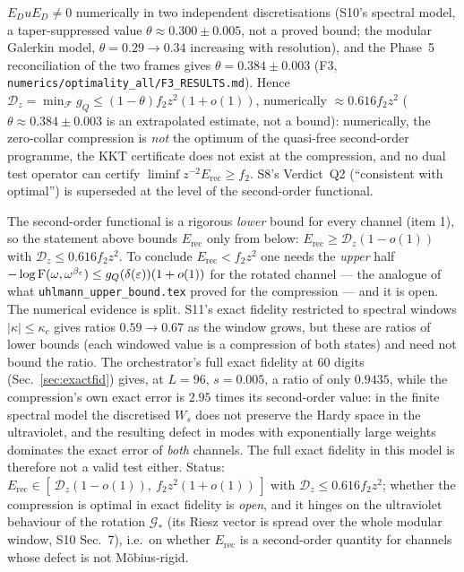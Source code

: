 \documentclass[11pt,a4paper]{article}
\newcommand{\Erec}{E_{\mathrm{rec}}}\newcommand{\Krec}{\mathcal K_{\mathrm{rec}}}
\begin{document}
\begin{verdictbreak}
\(E_DuE_D\ne0\) numerically in two independent discretisations (S10's spectral model,
a taper-suppressed value \(\theta\approx0.300\pm0.005\), not a proved bound; the modular Galerkin model,
\(\theta=0.29\to0.34\) increasing with resolution), and the Phase~5 reconciliation of the two
frames gives \(\theta=0.384\pm0.003\) (F3, \texttt{numerics/optimality\_all/F3\_RESULTS.md}).
Hence \(\mathcal D_z=\min_{\mathcal F}g_Q\le(1-\theta)f_2z^2(1+o(1))\), numerically \(\approx0.616f_2z^2\) (\(\theta\approx0.384\pm0.003\) is an extrapolated estimate, not a bound): numerically, the zero-collar
compression is \emph{not} the optimum of the quasi-free second-order programme, the KKT certificate
does not exist at the compression, and no dual test operator can certify \(\liminf z^{-2}\Erec\ge f_2\).
S8's Verdict~Q2 (``consistent with optimal'') is superseded at the level of the second-order functional.
\end{verdictbreak}

\begin{verdictgap}
The second-order functional is a rigorous \emph{lower} bound for every channel (item 1), so the
statement above bounds \(\Erec\) only from below: \(\Erec\ge\mathcal D_z(1-o(1))\) with
\(\mathcal D_z\le0.616f_2z^2\).  To conclude \(\Erec<f_2z^2\) one needs the \emph{upper} half
\(-\log\operatorname{F}(\omega,\omega^{\beta_\varepsilon})\le g_Q(\delta(\varepsilon))(1+o(1))\) for the rotated channel --- the
analogue of what \texttt{uhlmann\_upper\_bound.tex} proved for the compression --- and it is open.  The
numerical evidence is split.  S11's exact fidelity restricted to spectral windows \(|\kappa|\le\kappa_c\)
gives ratios \(0.59\to0.67\) as the window grows, but these are ratios of lower bounds (each windowed
value is a compression of both states) and need not bound the ratio.  The orchestrator's full exact
fidelity at \(60\) digits (Sec.~\ref{sec:exactfid}) gives, at \(L=96\), \(s=0.005\), a ratio of only
\(0.9435\), while the compression's own exact error is \(2.95\) times its second-order value: in the
finite spectral model the discretised \(W_s\) does not preserve the Hardy space in the ultraviolet,
and the resulting defect in modes with exponentially large weights dominates the exact error of
\emph{both} channels.  The full exact fidelity in this model is therefore not a valid test either.
Status: \(\Erec\in[\,\mathcal D_z(1-o(1)),\ f_2z^2(1+o(1))\,]\) with \(\mathcal D_z\le0.616f_2z^2\); whether the
compression is optimal in exact fidelity is \emph{open}, and it hinges on the ultraviolet behaviour
of the rotation \(\mathcal G_*\) (its Riesz vector is spread over the whole modular window, S10 Sec.~7),
i.e.\ on whether \(\Erec\) is a second-order quantity for channels whose defect is not
M\"obius-rigid.
\end{verdictgap}
\end{document}
